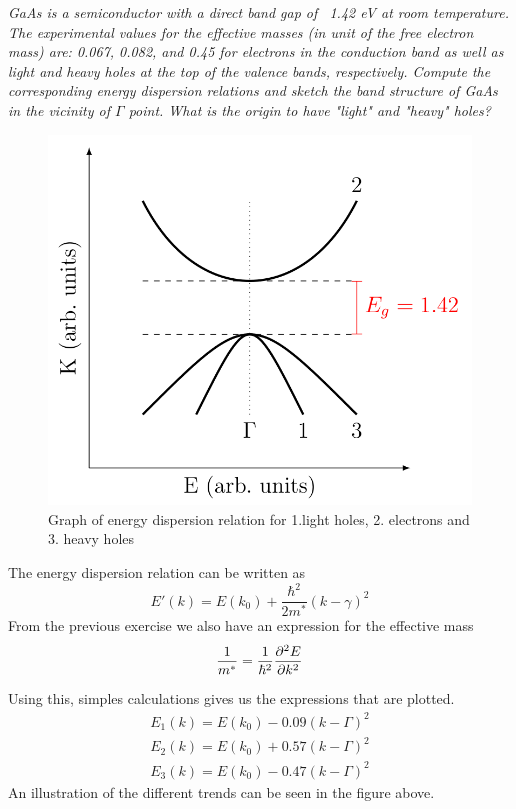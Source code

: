 \documentclass{article}
\begin{document}
\emph{GaAs is a semiconductor with a direct band gap of ~1.42 eV at room temperature. The
experimental values for the effective masses (in unit of the free electron mass) are: 0.067, 0.082,
and 0.45 for electrons in the conduction band as well as light and heavy holes at the top of the
valence bands, respectively. Compute the corresponding energy dispersion relations and sketch
the band structure of GaAs in the vicinity of $\Gamma$ point. What is the origin to have "light" and
"heavy" holes?}

\begin{figure}
	\includegraphics[width = 0.7\linewidth]{bandgap.png}
	\centering
	\caption{Graph of energy dispersion relation for 1.light holes, 2. electrons and 3. heavy holes}
\end{figure}

The energy dispersion relation can be written as
\begin{equation*}
	E'(k) = E(k_0) + \frac{\hbar^2}{2m^*}(k-\gamma)^2
\end{equation*}
From the previous exercise we also have an expression for the effective mass
\begin{equation*}
	\frac{1}{m^*} = \frac{1}{\hbar^2}\pdv[2]{E}{k}
\end{equation*}

Using this, simples calculations gives us the expressions that are plotted.
\begin{align*}
	E_1(k) = E(k_0)-0.09(k-\Gamma)^2\\
	E_2(k) = E(k_0)+0.57(k-\Gamma)^2\\
	E_3(k) = E(k_0)-0.47(k-\Gamma)^2
\end{align*}
An illustration of the different trends can be seen in the figure above.
\end{document}
